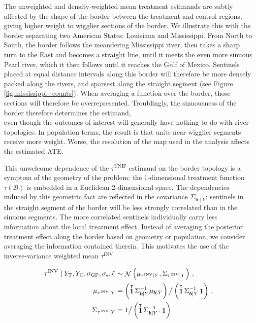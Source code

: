 \documentclass[letter]{article}
\DeclareMathOperator{\normal}{\mathcal{N}}
\DeclareMathOperator{\ones}{\mathbf{1}}
\newcommand{\trans}{^{\intercal}}
\newcommand{\treat}{\mathrm{T}}
\newcommand{\ctrol}{\mathrm{C}}
\newcommand{\sigmaf}{\sigma_{\mathrm{GP}}}
\newcommand{\sigman}{\sigma_{\epsilon}}
\newcommand{\boundary}{\mathcal{B}}
\newcommand{\sentinels}{\bm{b}}
\newcommand{\unifavg}{\tau^{\mathrm{UNIF}}}
\newcommand{\invvar}{\tau^{\mathrm{INV}}}
\newcommand{\eqlabel}[1]{\label{#1}}
\begin{document}
The unweighted and density-weighted mean treatment estimands are subtly affected by the shape of the border between the treatment and control regions,
giving higher weight to wigglier sections of the border.
We illustrate this with the border separating two American States: Louisiana and Mississippi.
From North to South, the border follows the meandering Mississippi river, then takes a sharp turn to the East and becomes a straight line, until it meets the even more sinuous Pearl river, which it then follows until it reaches the Gulf of Mexico.
Sentinels placed at equal distance intervals along this border will therefore be more densely packed along the rivers, and sparsest along the straight segment (see Figure \ref{fig:mississippi_counts}).
When averaging a function over the border, those sections will therefore be overrepresented.
Troublingly, the sinuousness of the border therefore determines the estimand,\\
even though the outcomes of interest will generally have nothing to do with river topologies.
In population terms, the result is that units near wigglier segments receive more weight.
Worse, the resolution of the map used in the analysis affects the estimated ATE.

This unwelcome dependence of the \(\unifavg\) estimand on the border topology is a symptom of the geometry of the problem: the 1-dimensional treatment function \(\tau(\boundary)\) is embedded in a Euclidean 2-dimensional space.
The dependencies induced by this geometric fact are reflected in the covariance \(\Sigma_{\sentinels \mid Y}\): sentinels in the straight segment of the border will be less strongly correlated than in the sinuous segments.
The more correlated sentinels individually carry less information about the local treatment effect.
Instead of averaging the posterior treatment effect along the border based on geometry or population, we consider averaging the information contained therein.
This motivates the use of the inverse-variance weighted mean \(\invvar\)

\begin{equation}
\begin{split}
    \left. \invvar \mid Y_\treat{}, Y_\ctrol{}, \sigmaf, \sigman, \ell \right. &\sim \normal\del{\mu_{\invvar \mid Y}, \Sigma_{\invvar \mid Y}} \,, \\
    \mu_{\invvar \mid Y} &= \del{\ones\trans \Sigma_{\sentinels \mid Y}^{-1} \mu_{\sentinels \mid Y}} \big/ \del{\ones\trans \Sigma_{\sentinels \mid Y}^{-1} \ones} \,, \\
    \Sigma_{\invvar \mid Y} &= 1 \big/ \del{\ones\trans \Sigma_{\sentinels \mid Y}^{-1} \,. \ones}
\end{split}
\eqlabel{eq:invvar}
\end{equation}
\end{document}
